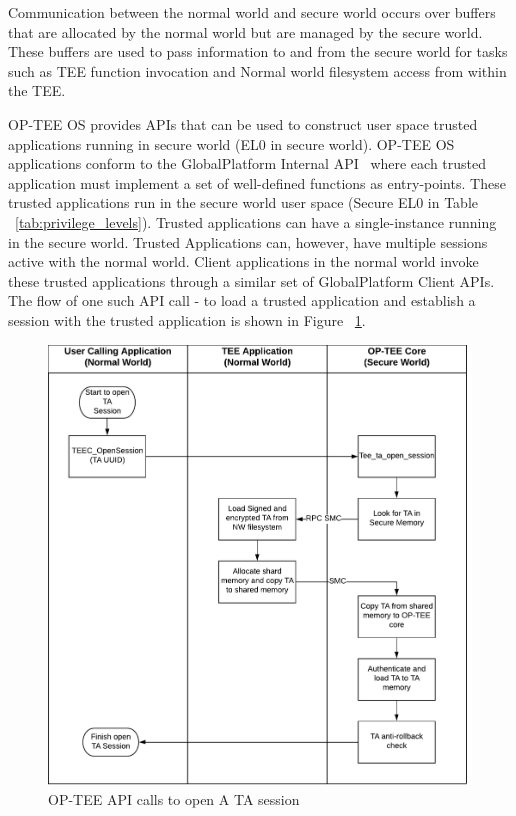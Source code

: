 Communication between the normal world and secure world occurs over buffers that are allocated by the normal world but are managed by the secure world. These buffers are used to pass information to and from the secure world for tasks such as TEE function invocation and Normal world filesystem access from within the TEE. 

OP-TEE OS provides APIs that can be used to construct user space trusted applications running in secure world (EL0 in secure world). OP-TEE OS applications conform to the GlobalPlatform Internal API~\cite{globalplatformAPI} where each trusted application must implement a set of well-defined functions as entry-points. These trusted applications run in the secure world user space (Secure EL0 in Table ~\ref{tab:privilege_levels}). Trusted applications can have a single-instance running in the secure world. Trusted Applications can, however, have multiple sessions active with the normal world. Client applications in the normal world invoke these trusted applications through a similar set of GlobalPlatform Client APIs. The flow of one such API call - to load a trusted application and establish a session with the trusted application is shown in Figure ~\ref{fig:ta_open}.

\begin{figure}
\centering
\includegraphics[width=\columnwidth]{fig/TA_Open.pdf}  
\caption{OP-TEE API calls to open A TA session}
\label{fig:ta_open}
\end{figure}

